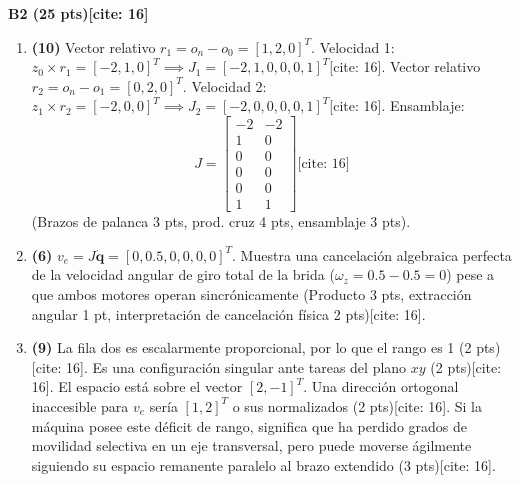\documentclass[11pt, a4paper]{article}
\begin{document}
\textbf{B2 (25 pts)[cite: 16]}
\begin{enumerate}\footnotesize
    \item \textbf{(10)} Vector relativo $r_1 = o_n - o_0 = [1, 2, 0]^T$. Velocidad 1: $z_0 \times r_1 = [-2, 1, 0]^T \implies J_1 = [-2, 1, 0, 0, 0, 1]^T$[cite: 16]. Vector relativo $r_2 = o_n - o_1 = [0, 2, 0]^T$. Velocidad 2: $z_1 \times r_2 = [-2, 0, 0]^T \implies J_2 = [-2, 0, 0, 0, 0, 1]^T$[cite: 16]. Ensamblaje:
    \begin{equation*}
        J = \begin{bmatrix} -2 & -2 \\ 1 & 0 \\ 0 & 0 \\ 0 & 0 \\ 0 & 0 \\ 1 & 1 \end{bmatrix} \text{[cite: 16]}
    \end{equation*}
    (Brazos de palanca 3 pts, prod. cruz 4 pts, ensamblaje 3 pts).
    \item \textbf{(6)} $v_e = J \dot{\mathbf{q}} = [0, 0.5, 0, 0, 0, 0]^T$. Muestra una cancelación algebraica perfecta de la velocidad angular de giro total de la brida ($\omega_z = 0.5 - 0.5 = 0$) pese a que ambos motores operan sincrónicamente (Producto 3 pts, extracción angular 1 pt, interpretación de cancelación física 2 pts)[cite: 16].
    \item \textbf{(9)} La fila dos es escalarmente proporcional, por lo que el rango es 1 (2 pts)[cite: 16]. Es una configuración singular ante tareas del plano $xy$ (2 pts)[cite: 16]. El espacio está sobre el vector $[2, -1]^T$. Una dirección ortogonal inaccesible para $v_e$ sería $[1, 2]^T$ o sus normalizados (2 pts)[cite: 16]. Si la máquina posee este déficit de rango, significa que ha perdido grados de movilidad selectiva en un eje transversal, pero puede moverse ágilmente siguiendo su espacio remanente paralelo al brazo extendido (3 pts)[cite: 16].
\end{enumerate}
\end{document}

